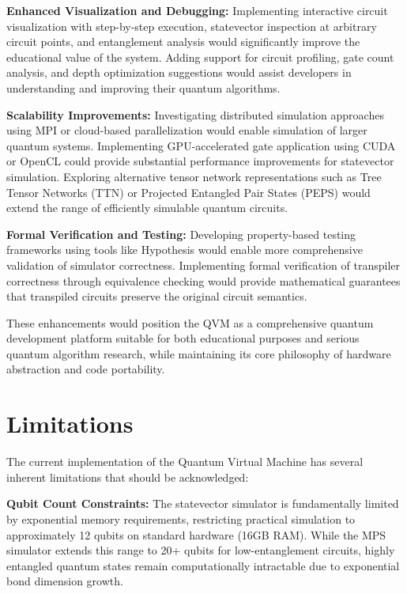 \textbf{Enhanced Visualization and Debugging:} Implementing interactive circuit visualization with step-by-step execution, statevector inspection at arbitrary circuit points, and entanglement analysis would significantly improve the educational value of the system. Adding support for circuit profiling, gate count analysis, and depth optimization suggestions would assist developers in understanding and improving their quantum algorithms.

\textbf{Scalability Improvements:} Investigating distributed simulation approaches using MPI or cloud-based parallelization would enable simulation of larger quantum systems. Implementing GPU-accelerated gate application using CUDA or OpenCL could provide substantial performance improvements for statevector simulation. Exploring alternative tensor network representations such as Tree Tensor Networks (TTN) or Projected Entangled Pair States (PEPS) would extend the range of efficiently simulable quantum circuits.

\textbf{Formal Verification and Testing:} Developing property-based testing frameworks using tools like Hypothesis would enable more comprehensive validation of simulator correctness. Implementing formal verification of transpiler correctness through equivalence checking would provide mathematical guarantees that transpiled circuits preserve the original circuit semantics.

These enhancements would position the QVM as a comprehensive quantum development platform suitable for both educational purposes and serious quantum algorithm research, while maintaining its core philosophy of hardware abstraction and code portability.


\section{Limitations}

The current implementation of the Quantum Virtual Machine has several inherent limitations that should be acknowledged:

\textbf{Qubit Count Constraints:} The statevector simulator is fundamentally limited by exponential memory requirements, restricting practical simulation to approximately 12 qubits on standard hardware (16GB RAM). While the MPS simulator extends this range to 20+ qubits for low-entanglement circuits, highly entangled quantum states remain computationally intractable due to exponential bond dimension growth.

